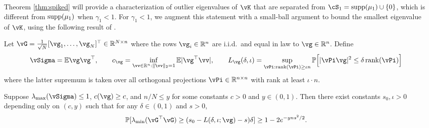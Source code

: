 Theorem \ref{thm:spiked} will provide a characterization
of outlier eigenvalues of $\vK$ that are separated from
$\cS_1=\supp{\mu_1} \cup \{0\}$, which is different from $\mathrm{supp}({\mu_1})$ when
$\gamma_1<1$. For $\gamma_1<1$, we augment this
statement with a small-ball argument to bound the smallest eigenvalue of $\vK$,
using the following result of \cite[Theorem 2.1]{yaskov2016controlling}.

\begin{lemma}\label{lemma:smallball}
Let $\vG=\frac{1}{\sqrt{N}}[\vg_1,\ldots,\vg_N]^\top \in \R^{N \times n}$ where
the rows $\vg_i \in \R^n$ are i.i.d.\ and equal in law to $\vg \in \R^n$. Define
\[\vSigma=\E\vg\vg^\top,
\qquad c_{\vg}=\inf_{\vv \in \R^n:\|\vv\|_2=1} \E|\vg^\top \vv|,
\qquad L_{\vg}(\delta,\iota)=\sup_{\vPi:\rank{\vPi} \geq \iota n}
\P\Big[|\vPi\vg|^2 \leq \delta\,\rank{\vPi}\Big]\]
where the latter supremum is taken over all orthogonal projections
$\vPi \in \R^{n \times n}$ with rank at least $\iota \cdot n$.

Suppose $\lambda_{\max}(\vSigma) \leq 1$, $c(\vg) \geq c$, and $n/N \leq
y$ for some constants $c>0$ and $y \in (0,1)$. Then there exist constants $s_0,\iota>0$
depending only on $(c,y)$ such that for any $\delta \in (0,1)$ and $s>0$,
\[\P[\lambda_{\min}(\vG^\top \vG) \geq (s_0-L(\delta,\iota;\vg)-s)\delta]
\geq 1-2e^{-yns^2/2}.\]
\end{lemma}

